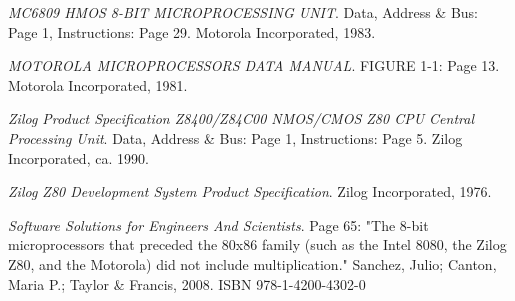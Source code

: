 \documentclass[twoside,twocolumn]{article}
\begin{document}
\begin{thebibliography}{99}
\textit{MC6809 HMOS 8-BIT MICROPROCESSING UNIT}.
Data, Address \& Bus: Page 1, Instructions: Page 29.
Motorola Incorporated, 1983.

\textit{MOTOROLA MICROPROCESSORS DATA MANUAL}.
FIGURE 1-1: Page 13.
Motorola Incorporated, 1981.

\textit{Zilog Product Specification Z8400/Z84C00 NMOS/CMOS Z80\textsuperscript{\textregistered} CPU Central Processing Unit}.
Data, Address \& Bus: Page 1, Instructions: Page 5.
Zilog Incorporated, ca. 1990.

\textit{Zilog Z80 Development System Product Specification}.
Zilog Incorporated, 1976.

\textit{Software Solutions for Engineers And Scientists}.
Page 65: "The 8-bit microprocessors that preceded the 80x86 family (such as the Intel 8080, the Zilog Z80, and the Motorola) did not include multiplication."
Sanchez, Julio; Canton, Maria P.; Taylor \& Francis, 2008.
ISBN 978-1-4200-4302-0


\end{thebibliography}

\end{document}
